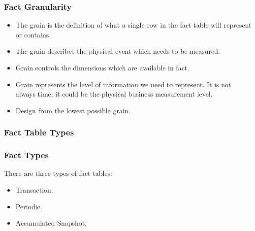 \begin{frame}
	\frametitle{Fact Granularity}
    	\begin{itemize}
                \item The grain is the definition of what a single row in the fact table will represent or contains.
                \item The grain describes the physical event which needs to be measured.
                \item Grain controls the dimensions which are available in fact.
                \item Grain represents the level of information we need to represent. It is not always time; it could be the physical business measurement level.
                \item Design from the lowest possible grain.
        	\end{itemize}
\end{frame}
\subsubsection{Fact Table Types}
\begin{frame}
	\frametitle{Fact Types}
	There are three types of fact tables:
	\begin{itemize}
		\item Transaction.
		\item Periodic.
		\item Accumulated Snapshot.
	\end{itemize}
\end{frame}

